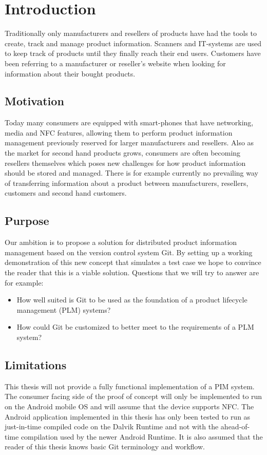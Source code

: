 \documentclass[12pt,a4paper]{article}
\begin{document}
\section{Introduction}
Traditionally only manufacturers and resellers of products have had the tools to create, track and manage product information. Scanners and IT-systems are used to keep track of products until they finally reach their end users. Customers have been referring to a manufacturer or reseller's website when looking for information about their bought products.

\subsection{Motivation}
Today many consumers are equipped with smart-phones that have networking, media and NFC features, allowing them to perform product information management previously reserved for larger manufacturers and resellers. Also as the market for second hand products grows, consumers are often becoming resellers themselves which poses new challenges for how product information should be stored and managed. There is for example currently no prevailing way of transferring information about a product between manufacturers, resellers, customers and second hand customers. 

\subsection{Purpose}
Our ambition is to propose a solution for distributed product information management based on the version control system Git. By setting up a working demonstration of this new concept that simulates a test case we hope to convince the reader that this is a viable solution. Questions that we will try to answer are for example:
\begin{itemize}
  \item How well suited is Git to be used as the foundation of a product lifecycle management (PLM) systems?
  \item How could Git be customized to better meet to the requirements of a PLM system?
\end{itemize} 

\subsection{Limitations}
This thesis will not provide a fully functional implementation of a PIM system. The consumer facing side of the proof of concept will only be implemented to run on the Android mobile OS and will assume that the device supports NFC. The Android application implemented in this thesis has only been tested to run as just-in-time compiled code on the Dalvik Runtime and not with the ahead-of-time compilation used by the newer Android Runtime. It is also assumed that the reader of this thesis knows basic Git terminology and workflow.
\end{document}
